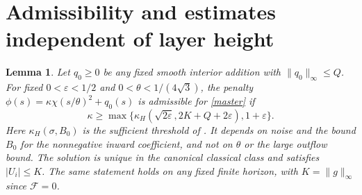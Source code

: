 \documentclass[11pt,a4paper]{article}
\newtheorem{lemma}[theorem]{Lemma}
\newcommand{\F}{\mathcal F}
\begin{document}
\section{Admissibility and estimates independent of layer height}
\begin{lemma}\label{admissible}
Let $q_0\geq0$ be any fixed smooth interior addition with
$\|q_0\|_\infty\leq Q$. For fixed $0<\varepsilon<1/2$ and
$0<\theta<1/(4\sqrt3)$, the penalty
$\phi(s)=\kappa\chi(s/\theta)^2+q_0(s)$ is admissible for
\eqref{master} if
\begin{equation}\label{height}
 \kappa\geq\max\{\kappa_H(\sqrt{2\varepsilon},2K+Q+2\varepsilon),
                     1+\varepsilon\}.
\end{equation}
Here $\kappa_H(\sigma,B_0)$ is the sufficient threshold of
\cite[Theorem 2.10]{BCCD}. It depends on noise and the bound $B_0$
for the nonnegative inward coefficient, and not on $\theta$ or the
large outflow bound. The solution is unique in the canonical classical
class and satisfies $|U_i|\leq K$. The same statement holds on any
fixed finite horizon, with $K=\|g\|_\infty$ since $\F=0$.
\end{lemma}
\end{document}
